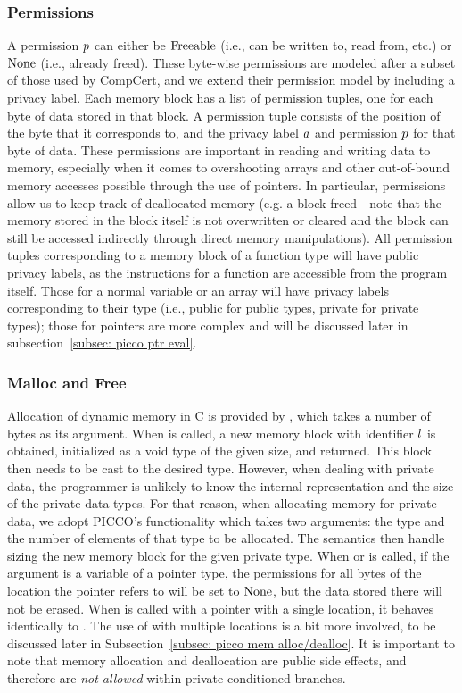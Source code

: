 \subsubsection{Permissions} 
\label{subsec: permissions}
A permission $p$ can either be $\mathrm{Freeable}$ (i.e., can be written to, read from, etc.) or 
$\mathrm{None}$ (i.e., already freed). 
These byte-wise permissions are modeled after a subset of those used by CompCert, and we extend their permission model by including a privacy label.
Each memory block has a list of permission tuples, one for each byte of data 
stored in that block. 
A permission tuple consists of the position of the byte that it corresponds to, and the privacy label $a$ and permission $p$ for that byte of data. 
These permissions are important in reading and writing data to memory, especially when it comes to overshooting arrays and other out-of-bound memory accesses possible through the use of pointers. 
In particular, permissions allow us to keep track of deallocated memory (e.g. a block freed - note that the memory stored in the block itself is not overwritten or cleared and the block can still be accessed indirectly through direct
memory manipulations). 
All permission tuples corresponding to a memory block of a function type will have public privacy labels, as the instructions for a function are accessible from the program itself. 
Those for a normal variable or an array will have privacy labels corresponding to their type (i.e., public for public types, private for private types); those for pointers are more complex and will be discussed later in subsection~\ref{subsec: picco ptr eval}.  




\subsubsection{Malloc and Free}
Allocation of dynamic memory in C is provided by , which takes a number of bytes as its argument. 
When  is called, 
a new memory block with identifier $l$ is obtained, initialized as a void type of the given size, and returned. 
This block then needs to be cast to the desired type. 
However, when dealing with private data, the programmer is unlikely to know the internal representation and the size of the private data types. 
For that reason, when allocating memory for private data, we adopt PICCO's  functionality which takes two arguments: the type and the number of elements of that type to be allocated. 
The semantics then handle sizing the new memory block for the given private type. 
When  or  is called, if the argument is a variable of a pointer type, the permissions for all bytes of the location the pointer refers to will be set to $\mathrm{None}$, but the data stored there will not be erased. 
When  is called with a pointer with a single location, it behaves identically to . 
The use of  with multiple locations is a bit more involved, to be discussed later in Subsection~\ref{subsec: picco mem alloc/dealloc}. 
It is important to note that memory allocation and deallocation are public side effects, and therefore are {\em not allowed} within private-conditioned branches. 



